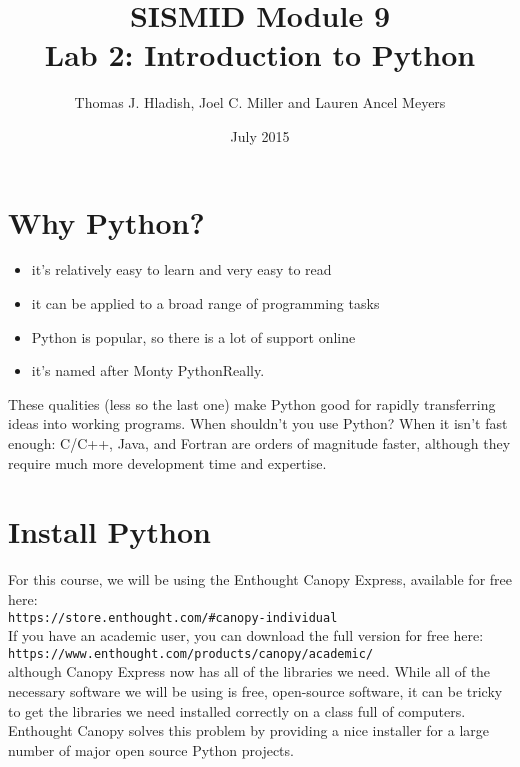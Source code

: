 \documentclass{article}
\begin{document}
\title{SISMID Module 9\\Lab 2: Introduction to Python}
\author{Thomas J. Hladish, Joel C. Miller and Lauren Ancel Meyers}
\date{July 2015}
\maketitle

\section*{Why Python?}
\begin{itemize}
\item it's relatively easy to learn and very easy to read
\item it can be applied to a broad range of programming tasks
\item Python is popular, so there is a lot of support online
\item it's named after Monty Python\textemdash Really.
\end{itemize}

These qualities (less so the last one) make Python good for rapidly transferring ideas into working programs.  When shouldn't you use Python?  When it
isn't fast enough: C/C++, Java, and Fortran are orders of magnitude faster, although they require much more development time and expertise.

\section*{Install Python}

For this course, we will be using the Enthought Canopy Express, available for free here:\\

\texttt{https://store.enthought.com/\#canopy-individual}\\

If you have an academic user, you can download the full version for free here:\\

\texttt{https://www.enthought.com/products/canopy/academic/}\\

\noindent
although Canopy Express now has all of the libraries we need.  While all of the necessary software we will be using is free, open-source software, it can be tricky to get the libraries we need installed correctly on a class full of computers. Enthought Canopy solves this problem by providing a nice installer for a large number of major open source Python projects.
\end{document}
